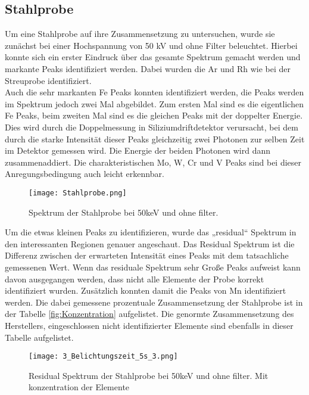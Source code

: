 \subsection{Stahlprobe}
Um eine Stahlprobe auf ihre Zusammensetzung zu untersuchen, wurde sie zunächst bei einer Hochspannung von 50 kV und ohne Filter beleuchtet. Hierbei konnte sich ein erster Eindruck über das gesamte Spektrum gemacht werden und markante Peaks identifiziert werden. Dabei wurden die Ar und Rh wie bei der Streuprobe identifiziert.\\
Auch die sehr markanten Fe Peaks konnten identifiziert werden, die Peaks werden im Spektrum jedoch zwei Mal abgebildet. Zum ersten Mal sind es die eigentlichen Fe Peaks, beim zweiten Mal sind es die gleichen Peaks mit der doppelter Energie. Dies wird durch die Doppelmessung in Siliziumdriftdetektor verursacht, bei dem durch die starke Intensität dieser Peaks gleichzeitig zwei Photonen zur selben Zeit im Detektor gemessen wird. Die Energie der beiden Photonen wird dann zusammenaddiert. Die charakteristischen Mo, W, Cr und V Peaks sind bei dieser Anregungsbedingung auch leicht erkennbar.\\

\begin{figure}[h]
 \centering
 \texttt{[image: Stahlprobe.png]}
 \caption[Stahlprobe Sprktrum]{Spektrum der Stahlprobe bei 50keV und ohne filter.}
 \label{fig:Stahlprobe}
\end{figure}

Um die etwas kleinen Peaks zu identifizieren, wurde das „residual“ Spektrum in den interessanten Regionen genauer angeschaut.  Das Residual Spektrum ist die Differenz zwischen der erwarteten Intensität eines Peaks mit dem tatsachliche gemessenen Wert. Wenn das residuale Spektrum sehr Große Peaks aufweist kann davon ausgegangen werden, dass nicht alle Elemente der Probe korrekt identifiziert wurden. Zusätzlich konnten damit die Peaks von Mn identifiziert werden. Die dabei gemessene prozentuale Zusammensetzung der Stahlprobe ist in der Tabelle \ref{fig:Konzentration} aufgelistet. Die genormte Zusammensetzung des Herstellers, eingeschlossen nicht identifizierter Elemente sind ebenfalls in dieser Tabelle aufgelistet.\\

\begin{figure}[h]
 \centering
 \texttt{[image: 3\_Belichtungszeit\_5s\_3.png]}
 \caption[Stahlprobe residual]{Residual Spektrum der Stahlprobe bei 50keV und ohne filter. Mit konzentration der Elemente}
 \label{fig:residual}
\end{figure}

